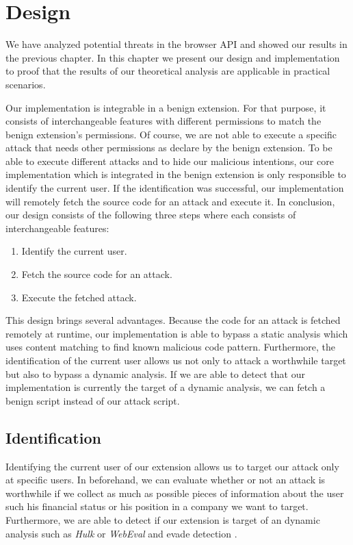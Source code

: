 
\chapter{Design}

	We have analyzed potential threats in the browser API and showed our results in the previous chapter. In this chapter we present our design and implementation to proof that the results of our theoretical analysis are applicable in practical scenarios. 
	
	Our implementation is integrable in a benign extension. For that purpose, it consists of interchangeable features with different permissions to match the benign extension's permissions. Of course, we are not able to execute a specific attack that needs other permissions as declare by the benign extension. To be able to execute different attacks and to hide our malicious intentions, our core implementation which is integrated in the benign extension is only responsible to identify the current user. If the identification was successful, our implementation will remotely fetch the source code for an attack and execute it. In conclusion, our design consists of the following three steps where each consists of interchangeable features:
	
	\begin{enumerate}
		\item Identify the current user.
		\item Fetch the source code for an attack.
		\item Execute the fetched attack.
	\end{enumerate}
	
	This design brings several advantages. Because the code for an attack is fetched remotely at runtime, our implementation is able to bypass a static analysis which uses content matching to find known malicious code pattern. Furthermore, the identification of the current user allows us not only to attack a worthwhile target but also to bypass a dynamic analysis. If we are able to detect that our implementation is currently the target of a dynamic analysis, we can fetch a benign script instead of our attack script. 
		
\section{Identification}

	

	Identifying the current user of our extension allows us to target our attack only at specific users. In beforehand, we can evaluate whether or not an attack is worthwhile if we collect as much as possible pieces of information about the user such his financial status or his position in a company we want to target. Furthermore, we are able to detect if our extension is target of an dynamic analysis such as \textit{Hulk} or \textit{WebEval} and evade detection \cite{184485,190984}.
	
